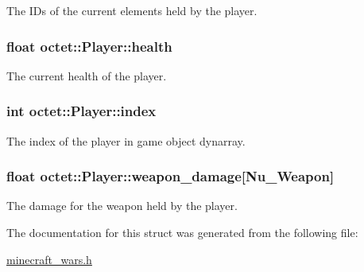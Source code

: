 The I\+Ds of the current elements held by the player. 

\hypertarget{structoctet_1_1_player_a2bdd50ed81043241cc239cd858e6fabb}{
\subsubsection[{health}]{\setlength{\rightskip}{0pt plus 5cm}float octet\+::\+Player\+::health}}\label{structoctet_1_1_player_a2bdd50ed81043241cc239cd858e6fabb}


The current health of the player. 

\hypertarget{structoctet_1_1_player_abcbda97162f67c67328c6578e9bafe29}{
\subsubsection[{index}]{\setlength{\rightskip}{0pt plus 5cm}int octet\+::\+Player\+::index}}\label{structoctet_1_1_player_abcbda97162f67c67328c6578e9bafe29}


The index of the player in game object dynarray. 

\hypertarget{structoctet_1_1_player_aea38c028487f7b6049478fa68cc9a493}{
\subsubsection[{weapon\+\_\+damage}]{\setlength{\rightskip}{0pt plus 5cm}float octet\+::\+Player\+::weapon\+\_\+damage\mbox{[}{\bf Nu\+\_\+\+Weapon}\mbox{]}}}\label{structoctet_1_1_player_aea38c028487f7b6049478fa68cc9a493}


The damage for the weapon held by the player. 



The documentation for this struct was generated from the following file\+:\begin{DoxyCompactItemize}
\item 
\hyperlink{minecraft__wars_8h}{minecraft\+\_\+wars.\+h}\end{DoxyCompactItemize}
